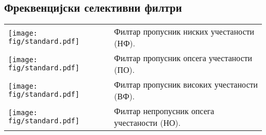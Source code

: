 \subsection*{Фреквенцијски селективни филтри}

\noindent
\begin{tabular}{ll}    
    \begin{minipage}{0.1\textwidth}
        \texttt{[image: fig/standard.pdf]}     
    \end{minipage}
    & 
    \begin{minipage}{0.8\textwidth}
        Филтар пропусник ниских учестаности (НФ). 
    \end{minipage}
    \\[5mm]
    \begin{minipage}{0.1\textwidth}
        \texttt{[image: fig/standard.pdf]}     
    \end{minipage}
    & 
    \begin{minipage}{0.8\textwidth}
        Филтар пропусник опсега учестаности (ПО).
    \end{minipage}
    \\[5mm]
    \begin{minipage}{0.1\textwidth}
        \texttt{[image: fig/standard.pdf]}     
    \end{minipage}
    & 
    \begin{minipage}{0.8\textwidth}
        Филтар пропусник високих учестаности (ВФ). 
    \end{minipage}
    \\[5mm]
    \begin{minipage}{0.1\textwidth}
        \texttt{[image: fig/standard.pdf]}     
    \end{minipage}
    & 
    \begin{minipage}{0.8\textwidth}
        Филтар непропусник опсега учестаности (НО).
    \end{minipage}
\end{tabular}

